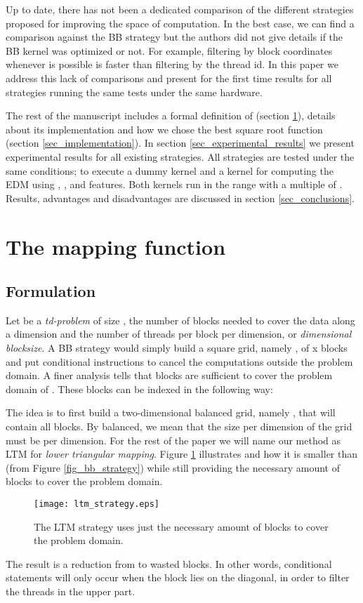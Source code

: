 \documentclass[conference]{IEEEtran}
\begin{document}
Up to date, there has not been a dedicated comparison of the different strategies proposed for improving the space of computation. In the best case, we can find a comparison against the BB strategy 
\cite{AvrilGA12} but the authors did not give details if the BB kernel was optimized or not. For example, 
filtering by block coordinates whenever is possible is faster than filtering by the thread id. 
In this paper we address this lack of comparisons and present for the first time results for all strategies running the same tests under the same hardware.

The rest of the manuscript includes a formal definition of  (section \ref{sec_td_strategy}), details about its implementation and how we chose the best square root function 
(section \ref{sec_implementation}). In section \ref{sec_experimental_results} we present experimental results for 
all existing strategies. All strategies are tested under the same conditions; to execute a dummy kernel and a kernel for computing 
the EDM using , ,  and  features. Both kernels run in the range  with  a multiple of . 
Results, advantages and disadvantages are discussed in section \ref{sec_conclusions}.










\section{The mapping function}
\label{sec_td_strategy}
\subsection{Formulation}
\label{sec_block_mapping_function}
Let  be a \textit{td-problem} of size ,   the number 
of blocks needed to cover the data along a dimension and  the number of threads per block per dimension, or 
\textit{dimensional blocksize}. 
A BB strategy would simply build a square grid, namely , of x blocks and put conditional instructions to cancel the computations 
outside the problem domain. A finer analysis tells that  blocks are sufficient to cover the problem domain of . 
These blocks can be indexed in the following way:

The idea is to first build a two-dimensional balanced grid, namely , that will contain all  blocks. 
By balanced, we mean that the size per dimension of the grid must be  per dimension. 
For the rest of the paper we will name our method as LTM for \textit{lower triangular mapping}.
Figure \ref{fig_ltm_strategy} illustrates  and how it is smaller than  (from Figure \ref{fig_bb_strategy}) 
while still providing the necessary amount of blocks to cover the problem domain.
\begin{figure}[ht!]
\centering
\texttt{[image: ltm\_strategy.eps]}
\caption{The LTM strategy uses just the necessary amount of blocks to cover the problem domain.}
\label{fig_ltm_strategy}
\end{figure}
The result is a reduction from  to  wasted blocks. In other words, conditional 
statements will only occur when the block lies on the diagonal, in order to filter the threads in the upper part.
\end{document}
